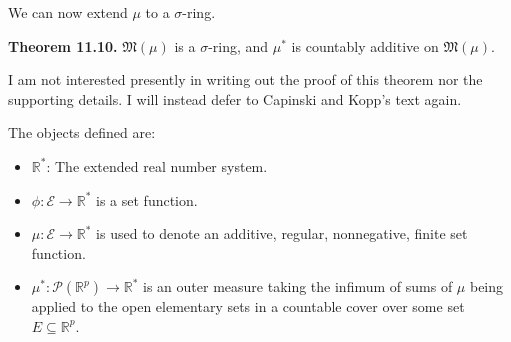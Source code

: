 \documentclass[a4paper]{article}
\newcommand{\R}{\mathbb{R}}
\begin{document}
We can now extend $\mu$ to a $\sigma$-ring.

\textbf{Theorem 11.10.} $\mathfrak{M}(\mu)$ is a $\sigma$-ring, and $\mu^*$ is countably additive on $\mathfrak{M}(\mu)$.

I am not interested presently in writing out the proof of this theorem nor the supporting details. I will instead defer to Capinski and Kopp's text again.

The objects defined are:
\begin{itemize}
    \item $\R^*$: The extended real number system.
    \item $\phi : \mathscr{E} \to \R^*$ is a set function.
    \item $\mu : \mathscr{E} \to \R^*$ is used to denote an additive, regular, nonnegative, finite set function.
    \item $\mu^* : \mathcal{P}(\R^p) \to \R^*$ is an outer measure taking the infimum of sums of $\mu$ being applied to the open elementary sets in a countable cover over some set $E \subseteq \R^p$.
\end{itemize}
\end{document}
